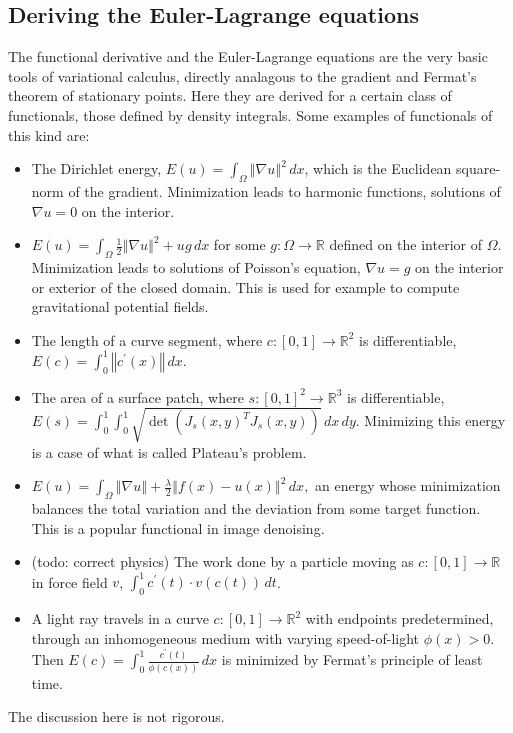 \documentclass[11pt,a4paper]{memoir}
\newcommand{\norm}[1]{\left\Vert#1\right\Vert}
\begin{document}
\subsection{Deriving the Euler-Lagrange equations} %
The functional derivative and the Euler-Lagrange equations are the very basic tools of variational calculus,
directly analagous to the gradient and Fermat's theorem of stationary points. Here they are derived for a certain
class of functionals, those defined by density integrals. Some examples of functionals of this kind are:
\begin{itemize}
\item
    The Dirichlet energy, $E(u) = \int_\Omega \norm{\nabla u}^2\,dx$, which is the Euclidean square-norm of the gradient.
    Minimization leads to harmonic functions, solutions of $\nabla u = 0$ on the interior.
\item
    $E(u) = \int_\Omega \frac{1}{2}\norm{\nabla u}^2 + ug\,dx$ for some $g:\Omega\rightarrow\mathbb{R}$ defined on the interior of $\Omega$.
    Minimization leads to solutions of Poisson's equation, $\nabla u = g$ on the interior or exterior of the closed domain. This is used
    for example to compute gravitational potential fields.
\item
    The length of a curve segment, where $c:[0,1]\rightarrow \mathbb{R}^2$ is differentiable, $E(c) = \int_0^1 \norm{c^\prime(x)}\,dx$.
\item
    The area of a surface patch, where $s:[0,1]^2\rightarrow \mathbb{R}^3$ is differentiable, $E(s) = \int_0^1\int_0^1 \sqrt{\det(J_s(x,y)^T J_s(x,y))}\,dx\,dy$.
    Minimizing this energy is a case of what is called Plateau's problem.
\item
    $E(u) = \int_\Omega \norm{\nabla u} + \frac{\lambda}{2} \norm{f(x) - u(x)}^2\,dx,$
    an energy whose minimization balances the total variation and the deviation from some target function.
    This is a popular functional in image denoising.
\item
    (todo: correct physics) The work done by a particle moving as $c:[0,1]\rightarrow \mathbb{R}$ in force field $v$,
    $\int_0^1 c^\prime(t)\cdot v(c(t))\,dt$.
\item
    A light ray travels in a curve $c:[0,1]\rightarrow \mathbb{R}^2$ with endpoints predetermined, through an inhomogeneous medium with varying speed-of-light $\phi(x) > 0$.
    Then $E(c) = \int_0^1 \frac{c^\prime(t)}{\phi(c(x))}\,dx$ is minimized by Fermat's principle of least time.
\end{itemize}
The discussion here is not rigorous.
\end{document}
